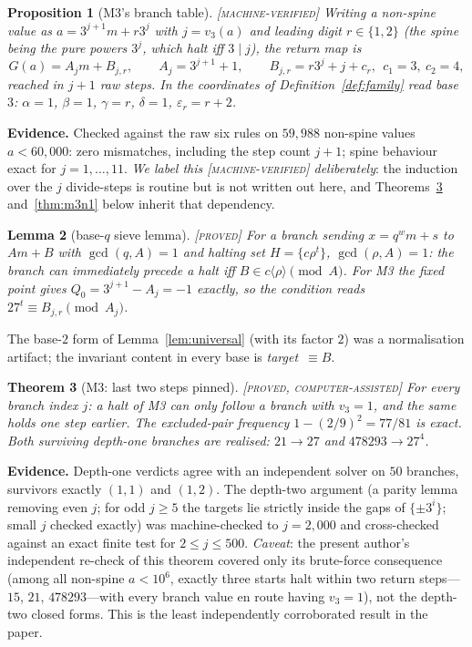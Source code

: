 \documentclass[11pt]{article}
\newtheorem{theorem}{Theorem}[section]
\newtheorem{lemma}[theorem]{Lemma}
\newtheorem{proposition}[theorem]{Proposition}
\theoremstyle{definition}
\theoremstyle{remark}
\newenvironment{evidence}
  {\par\smallskip\noindent\footnotesize\textbf{Evidence.}}
  {\par\smallskip}
\newcommand{\vp}[1]{v_{#1}}
\newcommand{\Proved}{\textsc{[proved]}}
\newcommand{\CAP}{\textsc{[proved, computer-assisted]}}
\newcommand{\MV}{\textsc{[machine-verified]}}
\begin{document}
\begin{proposition}[M3's branch table]\label{prop:m3table}
\MV{}\; Writing a non-spine value as $a=3^{j+1}m+r3^{j}$ with $j=\vp{3}(a)$ and
leading digit $r\in\{1,2\}$ (the spine being the pure powers $3^{j}$, which
halt iff $3\mid j$), the return map is
\[
G(a)=A_j m+B_{j,r},\qquad A_j=3^{j+1}+1,\qquad
B_{j,r}=r3^{j}+j+c_r,\ \ c_1=3,\ c_2=4,
\]
reached in $j+1$ raw steps.  In the coordinates of
Definition~\ref{def:family} read base $3$: $\alpha=1$, $\beta=1$,
$\gamma=r$, $\delta=1$, $\varepsilon_r=r+2$.
\end{proposition}

\begin{evidence}
Checked against the raw six rules on $59{,}988$ non-spine values $a<60{,}000$:
zero mismatches, including the step count $j+1$; spine behaviour exact for
$j=1,\dots,11$.  \emph{We label this \MV{} deliberately}: the induction over
the $j$ divide-steps is routine but is not written out here, and
Theorems~\ref{thm:m3n2} and~\ref{thm:m3n1} below inherit that dependency.
\end{evidence}

\begin{lemma}[base-$q$ sieve lemma]\label{lem:baseq}
\Proved{}\; For a branch sending $x=q^{w}m+s$ to $Am+B$ with $\gcd(q,A)=1$ and
halting set $H=\{c\rho^{t}\}$, $\gcd(\rho,A)=1$: the branch can immediately
precede a halt iff $B\in c\langle\rho\rangle\pmod A$.  For M3 the fixed point
gives $Q_0=3^{j+1}-A_j=-1$ exactly, so the condition reads
$27^{t}\equiv B_{j,r}\pmod{A_j}$.
\end{lemma}

The base-$2$ form of Lemma~\ref{lem:universal} (with its factor $2$) was a
normalisation artifact; the invariant content in every base is
\emph{target}~$\equiv B$.

\begin{theorem}[M3: last two steps pinned]\label{thm:m3n2}
\CAP{}\; For every branch index $j$: a halt of M3 can only follow a branch with
$\vp{3}=1$, and the same holds one step earlier.  The excluded-pair frequency
$1-(2/9)^2=77/81$ is exact.  Both surviving depth-one branches are realised:
$21\to27$ and $478293\to27^{4}$.
\end{theorem}

\begin{evidence}
Depth-one verdicts agree with an independent solver on $50$ branches, survivors
exactly $(1,1)$ and $(1,2)$.  The depth-two argument (a parity lemma removing
even $j$; for odd $j\ge5$ the targets lie strictly inside the gaps of
$\{\pm3^{i}\}$; small $j$ checked exactly) was machine-checked to $j=2{,}000$
and cross-checked against an exact finite test for $2\le j\le500$.
\emph{Caveat}: the present author's independent re-check of this theorem
covered only its brute-force consequence (among all non-spine $a<10^{6}$,
exactly three starts halt within two return steps---$15$, $21$,
$478293$---with every branch value en route having $\vp{3}=1$), not the
depth-two closed forms.  This is the least independently corroborated result in
the paper.
\end{evidence}
\end{document}
